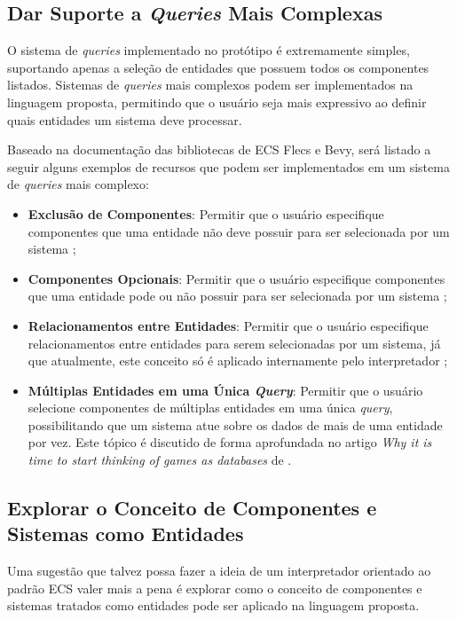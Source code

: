 \subsection{Dar Suporte a \textit{Queries} Mais Complexas}

O sistema de \textit{queries} implementado no protótipo é extremamente simples, suportando apenas a seleção de entidades que possuem todos os componentes listados. Sistemas de \textit{queries} mais complexos podem ser implementados na linguagem proposta, permitindo que o usuário seja mais expressivo ao definir quais entidades um sistema deve processar.

Baseado na documentação das bibliotecas de ECS Flecs e Bevy, será listado a seguir alguns exemplos de recursos que podem ser implementados em um sistema de \textit{queries} mais complexo:

\begin{itemize}
    \item \textbf{Exclusão de Componentes}: Permitir que o usuário especifique componentes que uma entidade não deve possuir para ser selecionada por um sistema \cite{flecs, bevy};
    \item \textbf{Componentes Opcionais}: Permitir que o usuário especifique componentes que uma entidade pode ou não possuir para ser selecionada por um sistema \cite{flecs, bevy};
    \item \textbf{Relacionamentos entre Entidades}: Permitir que o usuário especifique relacionamentos entre entidades para serem selecionadas por um sistema, já que atualmente, este conceito só é aplicado internamente pelo interpretador \cite{flecs, bevy};
    \item \textbf{Múltiplas Entidades em uma Única \textit{Query}}: Permitir que o usuário selecione componentes de múltiplas entidades em uma única \textit{query}, possibilitando que um sistema atue sobre os dados de mais de uma entidade por vez. Este tópico é discutido de forma aprofundada no artigo \textit{Why it is time to start thinking of games as databases} de .
\end{itemize}

\subsection{Explorar o Conceito de Componentes e Sistemas como Entidades}

Uma sugestão que talvez possa fazer a ideia de um interpretador orientado ao padrão ECS valer mais a pena é explorar como o conceito de componentes e sistemas tratados como entidades pode ser aplicado na linguagem proposta.

